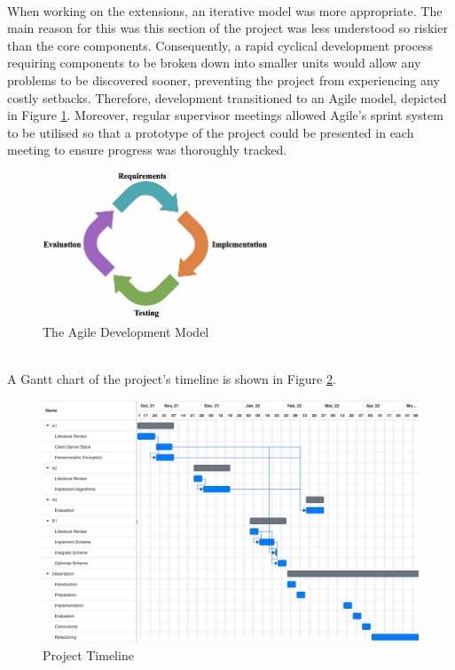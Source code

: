 \smallskip \\ \indent
When working on the extensions, an iterative model was more appropriate. The main reason for this was this section of the project was less understood so riskier than the core components. Consequently, a rapid cyclical development process requiring components to be broken down into smaller units would allow any problems to be discovered sooner, preventing the project from experiencing any costly setbacks. Therefore, development transitioned to an Agile model, depicted in Figure \ref{fig:agile}. Moreover, regular supervisor meetings allowed Agile's sprint system to be utilised so that a prototype of the project could be presented in each meeting to ensure progress was thoroughly tracked.
\begin{figure}[ht]
    \centering
    \includegraphics[width=0.6\textwidth]{figures/agile.png}
    \caption{The Agile Development Model}
    \label{fig:agile}
\end{figure}
\\ \indent
A Gantt chart of the project's timeline is shown in Figure \ref{fig:gantt}.
\begin{figure}[H]
    \centering
    \includegraphics[width=1\textwidth]{figures/gantt.png}
    \caption{Project Timeline}
    \label{fig:gantt}
\end{figure}


